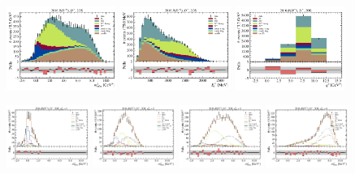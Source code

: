 \begin{figure}[htb]
    \centering
    \includegraphics[width=0.32\textwidth]{./figs-fit-fit-results/ctrl-fit/stacked/fit_result-stacked-Dst-2os-mmiss2.pdf}
    \includegraphics[width=0.32\textwidth]{./figs-fit-fit-results/ctrl-fit/stacked/fit_result-stacked-Dst-2os-el.pdf}
    \includegraphics[width=0.32\textwidth]{./figs-fit-fit-results/ctrl-fit/stacked/fit_result-stacked-Dst-2os-q2.pdf}

    \includegraphics[width=0.24\textwidth]{./figs-fit-fit-results/ctrl-fit/lines_q2_slices/fit_result-lines_q2_idx1-Dst-2os-mmiss2.pdf}
    \includegraphics[width=0.24\textwidth]{./figs-fit-fit-results/ctrl-fit/lines_q2_slices/fit_result-lines_q2_idx2-Dst-2os-mmiss2.pdf}
    \includegraphics[width=0.24\textwidth]{./figs-fit-fit-results/ctrl-fit/lines_q2_slices/fit_result-lines_q2_idx3-Dst-2os-mmiss2.pdf}
    \includegraphics[width=0.24\textwidth]{./figs-fit-fit-results/ctrl-fit/lines_q2_slices/fit_result-lines_q2_idx4-Dst-2os-mmiss2.pdf}


\end{figure}
